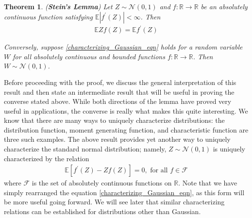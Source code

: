 \documentclass[12pt]{article}
\newcommand*{\abs}[1]{\left\lvert#1\right\rvert}
\newcommand{\R}{\mathbb{R}}
\newcommand{\E}{\mathbb{E}}
\newcommand{\Gaussian}{\mathcal{N}}
\newcommand{\functionSpace}{\mathcal{F}} %
\newtheorem{thm}{Theorem}
\begin{document}
\begin{thm} \label{Steins_lemma}
(\textbf{Stein's Lemma}) Let $Z \sim \Gaussian(0, 1)$ and $f: \R \to \R$ be an absolutely continuous function satisfying $\E\abs{f^\prime(Z)} < \infty$. Then 
\begin{align}
\E Z f(Z) = \E f^\prime(Z) \label{characterizing_Gaussian_eqn}
\end{align}

Conversely, suppose \ref{characterizing_Gaussian_eqn} holds for a random variable $W$ for all absolutely continuous and bounded functions $f: \R \to \R$. 
Then $W \sim \Gaussian(0, 1)$. 
\end{thm}

Before proceeding with the proof, we discuss the general interpretation of this result and then state an intermediate result that will be useful in proving the converse stated above. 
While both directions of the lemma have proved very useful in applications, the converse is really what makes this quite interesting. We know that there are many ways to uniquely 
characterize distributions: the distribution function, moment generating function, and characteristic function are three such examples. The above result provides yet another way to 
uniquely characterize the standard normal distribution; namely, $Z \sim \Gaussian(0, 1)$ is uniquely characterized by the relation 
\begin{align}
\E\left[f^\prime(Z) - Z f(Z)\right] = 0, \text{ for all } f \in \functionSpace \label{characterizing_Gaussian_eqn_2}
\end{align}
where $\functionSpace$ is the set of absolutely continuous functions on $\R$. Note that we have simply rearranged the equation \ref{characterizing_Gaussian_eqn}, as this 
form will be more useful going forward. 
We will see later that similar characterizing relations can be established for distributions other than 
Gaussian. 
\end{document}
